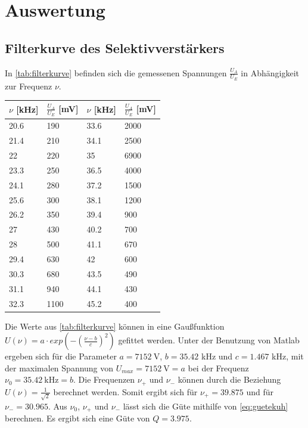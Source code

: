 


\section{Auswertung}

\subsection{Filterkurve des Selektivverstärkers}
In \autoref{tab:filterkurve} befinden sich die gemessenen Spannungen $\frac{U_{A}}{U_{E}}$ in Abhängigkeit zur Frequenz $\nu$.
\begin{table}[H]
 \centering 
 \begin{tabular}{l|l|l|l} 
 $\nu$ [kHz]& $\frac{U_{A}}{U_{E}}$ [mV] & $\nu$ [kHz]& $\frac{U_{A}}{U_{E}}$ [mV]\\  \hline
 20.6 & 190 & 33.6 & 2000\\ 
 21.4 & 210 & 34.1 & 2500\\ 
 22   & 220 & 35   & 6900\\
 23.3 & 250 & 36.5 & 4000\\
 24.1 & 280 & 37.2 & 1500\\
 25.6 & 300 & 38.1 & 1200\\
 26.2 & 350 & 39.4 & 900\\
 27   & 430 & 40.2 & 700\\
 28   & 500 & 41.1 & 670\\
 29.4 & 630 & 42   & 600\\
 30.3 & 680 & 43.5 & 490\\
 31.1 & 940 & 44.1 & 430\\
 32.3 & 1100 & 45.2 & 400\\ \hline
 \end{tabular} 
 \label{tab:filterkurve}
\end{table} 
Die Werte aus \autoref{tab:filterkurve} können in eine Gaußfunktion $U(\nu)=a\cdot exp(-(\frac{\nu-b}{c})^2)$ gefittet werden. 
Unter der Benutzung von Matlab ergeben sich für die Parameter $a=7152\ \si{\V}$, $b=35.42$ kHz und $c=1.467$ kHz, 
mit der maximalen Spannung von $U_{max}=7152\ \si{\V}=a$ bei der Frequenz $\nu_{0}=35.42\ \si{\kHz}=b$. 
Die Frequenzen $\nu_{+}$ und $\nu_{-}$ können durch die Beziehung $U(\nu)=\frac{1}{\sqrt{2}}$ berechnet werden. 
Somit ergibt sich für $\nu_{+}=39.875$ und für $\nu_{-}=30.965$. 
Aus $\nu_{0}$, $\nu_{+}$ und $\nu_{-}$ lässt sich die Güte mithilfe von \autoref{eq:guetekuh}
berechnen. Es ergibt sich eine Güte von $Q=3.975$.
